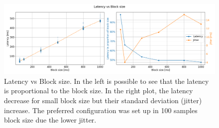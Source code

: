\begin{figure}
\begin{centering}
\includegraphics[width=1\textwidth]{Cap3/Figures/block_vs_latency.png}
\par\end{centering}
\caption[Latency vs Block size]{Latency vs Block size. 
In the left is possible to see that the latency is proportional to the block size. 
In the right plot, the latency decrease for small block size but their standard deviation (jitter) increase. 
The preferred configuration was set up in 100 samples block size due the lower jitter.}
\label{fig:latency_vs_block}
\end{figure}
